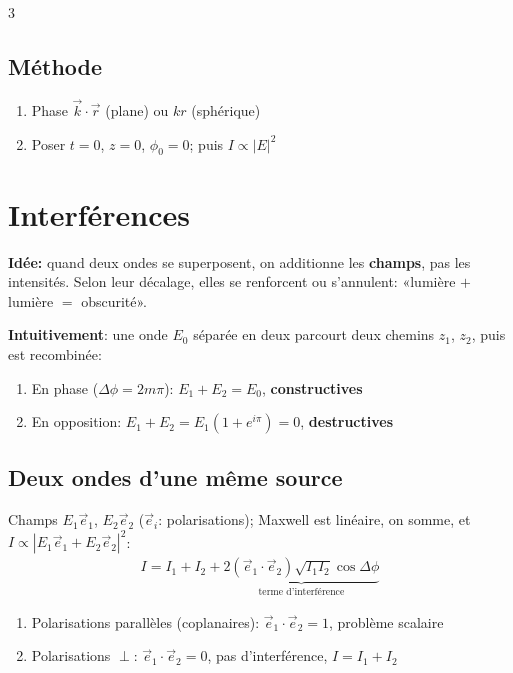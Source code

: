 \documentclass[12pt, a4paper]{article}
\newcommand{\ve}[1]{\vec{#1}}
\begin{document}
\begin{multicols*}{3}
	\subsection{Méthode}
	\begin{enumerate}[\roman*.]
		\item Phase $\ve k\cdot\ve r$ (plane) ou $kr$ (sphérique)
		\item Poser $t=0$, $z=0$, $\phi_0=0$; puis $I\propto|E|^2$
	\end{enumerate}

	\colbreak
	\section{Interférences}
	\textbf{Idée:} quand deux ondes se superposent, on additionne les \textbf{champs}, pas les intensités. Selon leur décalage, elles se renforcent ou s'annulent: «lumière $+$ lumière $=$ obscurité».

	\textbf{Intuitivement}: une onde $E_0$ séparée en deux parcourt deux chemins $z_1$, $z_2$, puis est recombinée:
	\begin{enumerate}[\roman*.]
		\item En phase ($\Delta\phi=2m\pi$): $E_1+E_2=E_0$, \textbf{constructives}
		\item En opposition: $E_1+E_2=E_1(1+e^{i\pi})=0$, \textbf{destructives}
	\end{enumerate}

	\subsection{Deux ondes d'une même source}
	Champs $E_1\ve e_1$, $E_2\ve e_2$ ($\ve e_i$: polarisations); Maxwell est linéaire, on somme, et $I\propto|E_1\ve e_1+E_2\ve e_2|^2$:
	\begin{gather*}
		I=I_1+I_2+\underbrace{2(\ve e_1\cdot\ve e_2)\sqrt{I_1I_2}\cos\Delta\phi}_{\text{terme d'interférence}}
	\end{gather*}
	\begin{enumerate}[\roman*.]
		\item Polarisations parallèles (coplanaires): $\ve e_1\cdot\ve e_2=1$, problème scalaire
		\item Polarisations $\perp$: $\ve e_1\cdot\ve e_2=0$, pas d'interférence, $I=I_1+I_2$
	\end{enumerate}


\end{multicols*}
\end{document}
